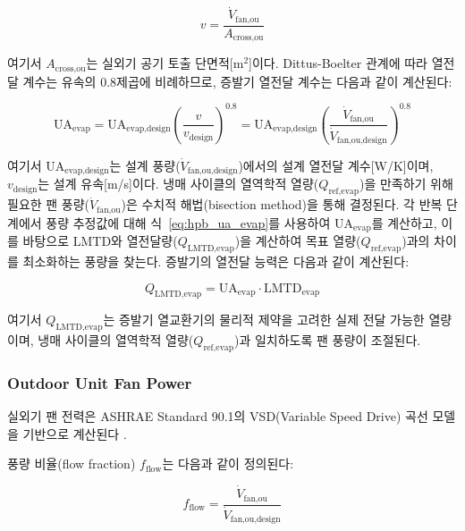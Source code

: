 \documentclass[final,5p,times,twocolumn,authoryear]{elsarticle}
\begin{document}
\begin{equation}
\label{eq:hpb_air_velocity}
v = \frac{\dot{V}_{\text{fan,ou}}}{A_{\text{cross,ou}}}
\end{equation}

여기서 $A_{\text{cross,ou}}$는 실외기 공기 토출 단면적[m$^2$]이다. Dittus-Boelter 관계에 따라 열전달 계수는 유속의 0.8제곱에 비례하므로,
증발기 열전달 계수는 다음과 같이 계산된다:

\begin{equation}
\label{eq:hpb_ua_evap}
\text{UA}_{\text{evap}} = \text{UA}_{\text{evap,design}} \left(\frac{v}{v_{\text{design}}}\right)^{0.8} = \text{UA}_{\text{evap,design}} \left(\frac{\dot{V}_{\text{fan,ou}}}{\dot{V}_{\text{fan,ou,design}}}\right)^{0.8}
\end{equation}

여기서 $\text{UA}_{\text{evap,design}}$는 설계 풍량($\dot{V}_{\text{fan,ou,design}}$)에서의 설계 열전달 계수[W/K]이며,
$v_{\text{design}}$는 설계 유속[m/s]이다.
냉매 사이클의 열역학적 열량($Q_{\text{ref,evap}}$)을 만족하기 위해 필요한
팬 풍량($\dot{V}_{\text{fan,ou}}$)은 수치적 해법(bisection method)을 통해 결정된다.
각 반복 단계에서 풍량 추정값에 대해 식~\eqref{eq:hpb_ua_evap}를 사용하여 $\text{UA}_{\text{evap}}$를 계산하고,
이를 바탕으로 LMTD와 열전달량($Q_{\text{LMTD,evap}}$)을 계산하여 목표 열량($Q_{\text{ref,evap}}$)과의 차이를 최소화하는 풍량을 찾는다.
증발기의 열전달 능력은 다음과 같이 계산된다:

\begin{equation}
\label{eq:hpb_q_lmtd_evap}
Q_{\text{LMTD,evap}} = \text{UA}_{\text{evap}} \cdot \text{LMTD}_{\text{evap}}
\end{equation}

여기서 $Q_{\text{LMTD,evap}}$는 증발기 열교환기의 물리적 제약을 고려한 실제 전달 가능한 열량이며, 냉매 사이클의 열역학적 열량($Q_{\text{ref,evap}}$)과 일치하도록 팬 풍량이 조절된다.

\subsubsection{Outdoor Unit Fan Power}

실외기 팬 전력은 ASHRAE Standard 90.1의 VSD(Variable Speed Drive) 곡선 모델을 기반으로 계산된다
\cite{ashrae2022standard}. 

풍량 비율(flow fraction) $f_{\text{flow}}$는 다음과 같이 정의된다:

\begin{equation}
\label{eq:hpb_fan_flow_fraction}
f_{\text{flow}} = \frac{\dot{V}_{\text{fan,ou}}}{\dot{V}_{\text{fan,ou,design}}}
\end{equation}
\end{document}
